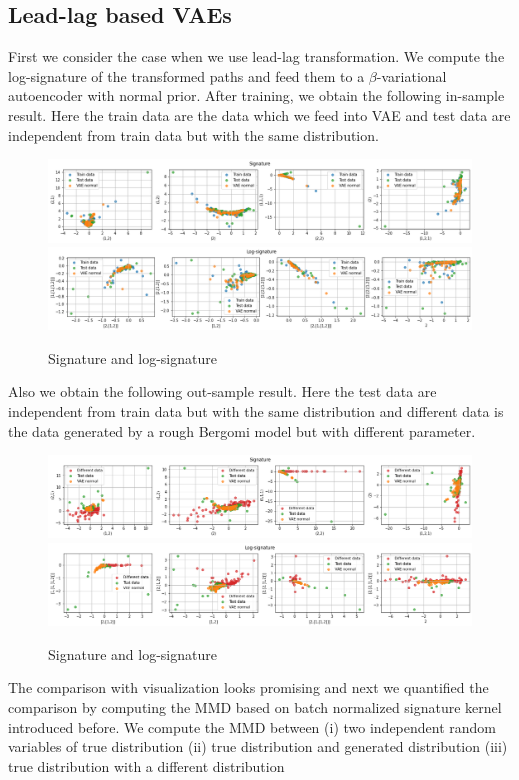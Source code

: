 \documentclass[12pt]{report}
\theoremstyle{definition}
\theoremstyle{remark}
\begin{document}
\subsection{Lead-lag based VAEs}
First we consider the case when we use lead-lag transformation. We compute the log-signature of the transformed paths and feed them to a $\beta$-variational autoencoder with normal prior. After training, we obtain the following in-sample result. Here the train data are the data which we feed into VAE and test data are independent from train data but with the same distribution.
 \begin{figure}[H]
    \centering
    \includegraphics[width=\textwidth]{figs/cvae6.png}
    \includegraphics[width=\textwidth]{figs/cvae7.png}
    \caption{Signature and log-signature}
\end{figure}
Also we obtain the following out-sample result. Here the test data are independent from train data but with the same distribution and different data is the data generated by a rough Bergomi model but with different parameter.
 \begin{figure}[H]
    \centering
    \includegraphics[width=\textwidth]{figs/cvae8.png}
    \includegraphics[width=\textwidth]{figs/cvae9.png}
    \caption{Signature and log-signature}
\end{figure}
The comparison with visualization looks promising and next we quantified the comparison by computing the MMD based on batch normalized signature kernel introduced before. We compute the MMD between (i) two independent random variables of true distribution (ii) true distribution and generated distribution (iii) true distribution with a different distribution 
\end{document}
